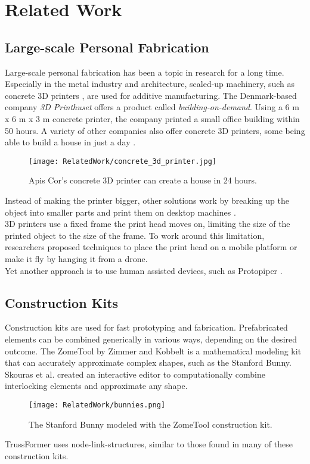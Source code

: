 \chapter{Related Work}\label{ch:relatedwork}
\section{Large-scale Personal Fabrication}
Large-scale personal fabrication has been a topic in research for a long time. Especially in the metal industry and architecture, scaled-up machinery, such as concrete 3D printers \cite{epstein:2003}, are used for additive manufacturing. The Denmark-based company \textit{3D Printhuset}\cite{printhuset} offers a product called \textit{building-on-demand}. Using a 6 m x 6 m x 3 m concrete printer, the company printed a small office building within 50 hours. A variety of other companies also offer concrete 3D printers, some being able to build a house in just a day \cite{apiscor}.\\
\begin{figure}[h!]
    \texttt{[image: RelatedWork/concrete\_3d\_printer.jpg]}
    \centering
    \caption{Apis Cor’s concrete 3D printer can create a house in 24 hours.}
    \label{fig:concrete_3d_printer}
\end{figure}
Instead of making the printer bigger, other solutions work by breaking up the object into smaller parts and print them on desktop machines \cite{lau:2011, luo:2012}.\\
3D printers use a fixed frame the print head moves on, limiting the size of the printed object to the size of the frame. To work around this limitation, researchers proposed techniques to place the print head on a mobile platform \cite{jokic:2016} or make it fly \cite{willmann:2012} by hanging it from a drone.\\
Yet another approach is to use human assisted devices, such as Protopiper \cite{agrawal:2015}.

\section{Construction Kits}
Construction kits are used for fast prototyping and fabrication. Prefabricated elements can be combined generically in various ways, depending on the desired outcome. The ZomeTool by Zimmer and Kobbelt \cite{zimmer:2014} is a mathematical modeling kit that can accurately approximate complex shapes, such as the Stanford Bunny. Skouras et al. \cite{skouras:2015} created an interactive editor to computationally combine interlocking elements and approximate any shape.\\
\begin{figure}[h!]
    \texttt{[image: RelatedWork/bunnies.png]}
    \centering
    \caption{The Stanford Bunny modeled with the ZomeTool construction kit.}
    \label{fig:bunnies}
\end{figure}
TrussFormer uses node-link-structures, similar to those found in many of these construction kits.

